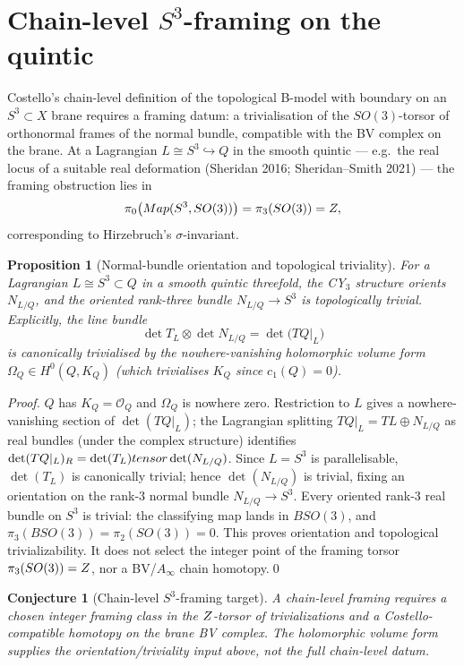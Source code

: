 \documentclass[12pt]{amsart}
\newtheorem{prop}[thm]{Proposition}
\newtheorem{conj}[thm]{Conjecture}
\theoremstyle{remark}
\providecommand{\cO}{\mathcal{O}}
\begin{document}
\section{Chain-level $S^3$-framing on the quintic}

Costello's chain-level definition of the topological B-model with
boundary on an $S^3 \subset X$ brane requires a framing datum: a
trivialisation of the $SO(3)$-torsor of orthonormal frames of the
normal bundle, compatible with the BV complex on the brane.
At a Lagrangian $L \cong S^3 \hookrightarrow Q$ in the smooth
quintic --- e.g.\ the real locus of a suitable real deformation
(Sheridan 2016; Sheridan--Smith 2021) --- the framing obstruction
lies in
$$\pi_0\bigl(Map(S^3, SO(3))\bigr) = \pi_3(SO(3)) = Z,$$
corresponding to Hirzebruch's $\sigma$-invariant.

\begin{prop}[Normal-bundle orientation and topological triviality]
  \label{prop:s3-framing-quintic}
  For a Lagrangian $L \cong S^3 \subset Q$ in a smooth quintic
  threefold, the CY$_3$ structure orients \(N_{L/Q}\), and the oriented
  rank-three bundle \(N_{L/Q}\to S^3\) is topologically trivial.
  Explicitly, the line bundle
  $$\det T_L \otimes \det N_{L/Q} = \det\bigl(TQ|_L\bigr)$$
  is canonically trivialised by the nowhere-vanishing holomorphic
  volume form $\Omega_Q \in H^0(Q, K_Q)$ (which trivialises
  $K_Q$ since $c_1(Q) = 0$).
\end{prop}

\begin{proof}
  $Q$ has $K_Q = \cO_Q$ and $\Omega_Q$ is nowhere zero. Restriction
  to $L$ gives a nowhere-vanishing section of $\det(TQ|_L)$; the
  Lagrangian splitting $TQ|_L = TL \oplus N_{L/Q}$ as real bundles
  (under the complex structure) identifies
  $\det(TQ|_L)_{R} = \det(T_L) tensor \det(N_{L/Q})$. Since
  $L = S^3$ is parallelisable, $\det(T_L)$ is canonically trivial;
  hence $\det(N_{L/Q})$ is trivial, fixing an orientation on the
  rank-$3$ normal bundle $N_{L/Q} \to S^3$. Every oriented rank-$3$
  real bundle on $S^3$ is trivial: the classifying map lands in
  $BSO(3)$, and $\pi_3(BSO(3)) = \pi_2(SO(3)) = 0$. This proves
  orientation and topological trivializability.  It does not select the
  integer point of the framing torsor
  \(\pi_3(SO(3))=Z\), nor a BV/$A_\infty$ chain homotopy.\qed
\end{proof}

\begin{conj}[Chain-level \(S^3\)-framing target]
  A chain-level framing requires a chosen integer framing class in the
  \(Z\)-torsor of trivializations and a Costello-compatible homotopy on
  the brane BV complex.  The holomorphic volume form supplies the
  orientation/triviality input above, not the full chain-level datum.
\end{conj}
\end{document}
